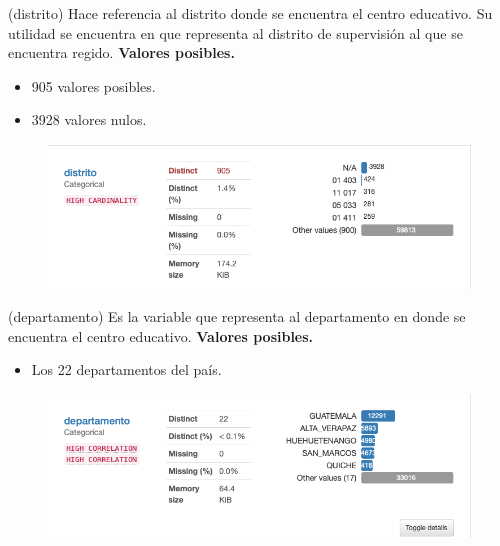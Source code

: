 
\begin{variable}(distrito) 
	Hace referencia al distrito donde se encuentra el centro educativo. Su utilidad se encuentra en que representa al distrito de supervisión al que se encuentra regido. 
	\bigbreak 
	\textbf{Valores posibles.}
	\begin{itemize}
		\item 905 valores posibles. 
		\item 3928 valores nulos.
	\end{itemize}
	\begin{figure}[H]
		\centering
		\includegraphics[scale=0.5]{Images/2}
	\end{figure}
\end{variable}


\begin{variable}(departamento) 
Es la variable que representa al departamento en donde se encuentra el centro educativo.
\bigbreak 
\textbf{Valores posibles.}
\begin{itemize}
	\item Los 22 departamentos del país. 
\end{itemize}
\begin{figure}[H]
	\centering
	\includegraphics[scale=0.5]{Images/3}
\end{figure}
\end{variable}


